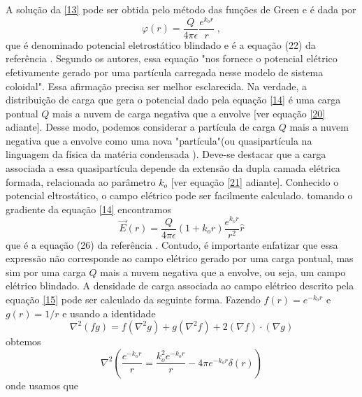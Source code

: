 \documentclass[brazilian,10.7pt,a4paper]{article}
\begin{document}
\begin{multicols}{2}
\par A solução da \eqref{13} pode ser obtida pelo método das funções de Green e é dada por 
\\
\begin{equation}\label{14}
\varphi(r)=\frac{Q}{4\pi\epsilon}\frac{e^{k_{o}r}}{r}\;,
\end{equation}
que é denominado potencial eletrostático blindado e é a equação (22) da referência \cite{ramos}. Segundo os autores, essa equação "nos fornece o potencial elétrico efetivamente gerado por uma partícula carregada nesse modelo de sistema coloidal". Essa afirmação precisa ser melhor esclarecida. Na verdade, a distribuição de carga que gera o potencial dado pela equação \eqref{14} é uma carga pontual $Q$ mais a nuvem de carga negativa que a envolve [ver equação \eqref{20} adiante]. Desse modo, podemos considerar a partícula de carga $Q$ mais a nuvem negativa que a envolve como uma nova "partícula"(ou quasipartícula na linguagem da física da matéria condensada \cite{ribeiro}). Deve-se destacar que a carga associada a essa quasipartícula depende da extensão da dupla camada elétrica formada, relacionada ao parâmetro $k_{o}$ [ver equação \eqref{21} adiante]. Conhecido o potencial eltrostático, o campo elétrico pode ser facilmente calculado. tomando o gradiente da equação \eqref{14} encontramos
\\
\begin{equation}\label{15}
\vec{E}(r)=\frac{Q}{4\pi\epsilon}(1+k_{o}r)\frac{e^{k_{o}r}}{r^{2}}\hat{r}
\end{equation}
que é a equação (26) da referência \cite{ramos}. Contudo, é importante enfatizar que essa expressão não corresponde ao campo elétrico gerado por uma carga pontual, mas sim por uma carga $Q$ mais a nuvem negativa que a envolve, ou seja, um campo elétrico blindado. A densidade de carga associada ao campo elétrico descrito pela equação \eqref{15} pode ser calculado da seguinte forma. Fazendo $f(r)=e^{-k_{o}r}$ e $g(r) = 1/r$ e usando a identidade
\\
\begin{equation}\label{16}
\nabla^{2}(fg)=f(\nabla^{2}g)+g(\nabla^{2}f)+2(\nabla f)\cdot(\nabla g)
\end{equation}
obtemos
\\
\begin{equation}\label{17}
\nabla^{2}(\frac{e^{-k_{o}r}}{r}=\frac{k^{2}_{o}e^{-k_{o}r}}{r}-4\pi e^{-k_{o}r}\delta(r))
\end{equation}
onde usamos que
\\

\end{multicols}
\end{document}
